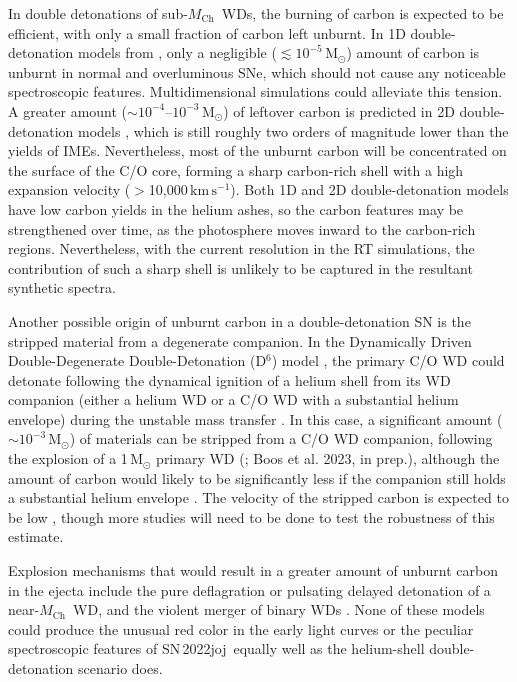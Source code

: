 \documentclass[twocolumn]{aastex631}
\newcommand{\sn}{SN\,2022joj}
\newcommand{\Mch}{$M_\mathrm{Ch}$}
\newcommand{\kms}{$\mathrm{km}\,\mathrm{s}^{-1}$}
\begin{document}
\begin{CJK*}{UTF8}{gbsn}
In double detonations of sub-\Mch\ WDs, the burning of carbon is expected to be efficient, with only a small fraction of carbon left unburnt. In 1D double-detonation models from \citet{polin_observational_2019}, only a negligible ($\lesssim$$10^{-5}\,\mathrm{M_\odot}$) amount of carbon is unburnt in normal and overluminous SNe, which should not cause any noticeable spectroscopic features. Multidimensional simulations could alleviate this tension. A greater amount ($\sim$$10^{-4}$--$10^{-3}$\,$\mathrm{M_\odot}$) of leftover carbon is predicted in 2D double-detonation models \citep{Fink_DD_2010,Boos_2021}, which is still roughly two orders of magnitude lower than the yields of IMEs. Nevertheless, most of the unburnt carbon will be concentrated on the surface of the C/O core, forming a sharp carbon-rich shell \citep[see Figure~5--8 in][]{Boos_2021} with a high expansion velocity ($>$10,000\,\kms). Both 1D and 2D double-detonation models have low carbon yields in the helium ashes, so the carbon features may be strengthened over time, as the photosphere moves inward to the carbon-rich regions. Nevertheless, with the current resolution in the RT simulations, the contribution of such a sharp shell is unlikely to be captured in the resultant synthetic spectra. 

Another possible origin of unburnt carbon in a double-detonation SN is the stripped material from a degenerate companion. In the Dynamically Driven Double-Degenerate Double-Detonation (D$^6$) model \citep{Shen_2018}, the primary C/O WD could detonate following the dynamical ignition of a helium shell from its WD companion (either a helium WD or a C/O WD with a substantial helium envelope) during the unstable mass transfer \citep{Guillochon_2010,Pakmor_2013}. In this case, a significant amount ($\sim$$10^{-3}\,\mathrm{M_\odot}$) of materials can be stripped from a C/O WD companion, following the explosion of a 1\,$\mathrm{M_\odot}$ primary WD (\citealp{Tanikawa_2018}; Boos et al. 2023, in prep.), although the amount of carbon would likely to be significantly less if the companion still holds a substantial helium envelope \citep{Tanikawa_2019}. The velocity of the stripped carbon is expected to be low \citep[e.g., centered at $\sim$3000\,\kms\ in][]{Tanikawa_2018}, though more studies will need to be done to test the robustness of this estimate.

Explosion mechanisms that would result in a greater amount of unburnt carbon in the ejecta include the pure deflagration \citep{Nomoto_1984b} or pulsating delayed detonation \citep{Hoeflich_1995,Dessart_2014} of a near-\Mch\ WD, and the violent merger of binary WDs \citep{Raskin_2014}. None of these models could produce the unusual red color in the early light curves or the peculiar spectroscopic features of \sn\ equally well as the helium-shell double-detonation scenario does. %


\end{CJK*}
\end{document}
